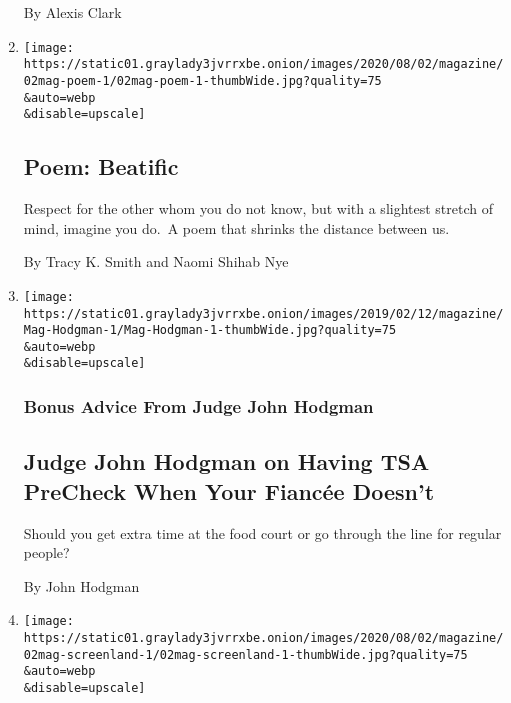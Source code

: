 \begin{enumerate}
  By Alexis Clark
\item
  \href{/2020/07/30/magazine/poem-beatific.html}{}

  \texttt{[image: https://static01.graylady3jvrrxbe.onion/images/2020/08/02/magazine/02mag-poem-1/02mag-poem-1-thumbWide.jpg?quality=75\\\&auto=webp\\\&disable=upscale]}

  \hypertarget{poem-beatific}{%
  \subsection{Poem: Beatific}\label{poem-beatific}}

  Respect for the other whom you do not know, but with a slightest
  stretch of mind, imagine you do.~A poem that shrinks the distance
  between us.

  By Tracy K. Smith and Naomi Shihab Nye
\item
  \href{/2020/07/30/magazine/judge-john-hodgman-on-having-tsa-precheck-when-your-fiancee-doesnt.html}{}

  \texttt{[image: https://static01.graylady3jvrrxbe.onion/images/2019/02/12/magazine/Mag-Hodgman-1/Mag-Hodgman-1-thumbWide.jpg?quality=75\\\&auto=webp\\\&disable=upscale]}

  \hypertarget{bonus-advice-from-judge-john-hodgman}{%
  \subsubsection{Bonus Advice From Judge John
  Hodgman}\label{bonus-advice-from-judge-john-hodgman}}

  \hypertarget{judge-john-hodgman-on-having-tsa-precheck-when-your-fiancuxe9e-doesnt}{%
  \subsection{Judge John Hodgman on Having TSA PreCheck When Your
  Fiancée
  Doesn't}\label{judge-john-hodgman-on-having-tsa-precheck-when-your-fiancuxe9e-doesnt}}

  Should you get extra time at the food court or go through the line for
  regular people?

  By John Hodgman
\item
  \href{/2020/07/29/magazine/i-may-destroy-you-hbo-michaela-coel.html}{}

  \texttt{[image: https://static01.graylady3jvrrxbe.onion/images/2020/08/02/magazine/02mag-screenland-1/02mag-screenland-1-thumbWide.jpg?quality=75\\\&auto=webp\\\&disable=upscale]}


\end{enumerate}
